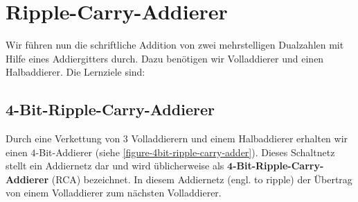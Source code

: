 
\toggletrue{image}
\toggletrue{imagehover}

\chapter{Ripple-Carry-Addierer}
\label{ch:ripple-carry-addierer}

\vspace{-0.5cm}

Wir führen nun die schriftliche Addition von zwei mehrstelligen Dualzahlen mit Hilfe eines Addiergitters durch. Dazu benötigen wir Volladdierer und einen Halbaddierer. Die Lernziele sind:\\


\vspace{-0.8cm}

\section{4-Bit-Ripple-Carry-Addierer}

Durch eine Verkettung von \num{3} Volladdierern und einem Halbaddierer erhalten wir einen $4$-Bit-Addierer (siehe \autoref{figure-4bit-ripple-carry-adder}). Dieses Schaltnetz stellt ein Addiernetz dar und wird üblicherweise als \textbf{$\mathbf{4}$-Bit-Ripple-Carry-Addierer} (\acs{RCA}) bezeichnet. In diesem Addiernetz  (engl. to ripple) der Übertrag von einem Volladdierer zum nächsten Volladdierer.

\vspace{-0.25cm}

